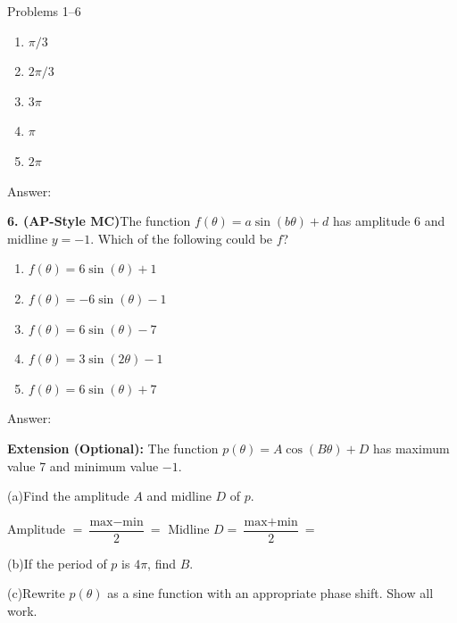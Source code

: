 \documentclass[10pt]{article}
\begin{document}
\begin{notesbox}{Problems 1--6}
\begin{enumerate}[label=(\Alph*), leftmargin=2em, itemsep=3pt]
  \item $\pi/3$
  \item $2\pi/3$
  \item $3\pi$
  \item $\pi$
  \item $2\pi$
\end{enumerate}

Answer: \underline{\hspace{1.5cm}}

\vspace{0.12in}
\textbf{6. (AP-Style MC)}\quad The function $f(\theta) = a\sin(b\theta) + d$
has amplitude 6 and midline $y = -1$. Which of the following could be $f$?

\begin{enumerate}[label=(\Alph*), leftmargin=2em, itemsep=3pt]
  \item $f(\theta) = 6\sin(\theta) + 1$
  \item $f(\theta) = -6\sin(\theta) - 1$
  \item $f(\theta) = 6\sin(\theta) - 7$
  \item $f(\theta) = 3\sin(2\theta) - 1$
  \item $f(\theta) = 6\sin(\theta) + 7$
\end{enumerate}

Answer: \underline{\hspace{1.5cm}}

\end{notesbox}

\vspace{0.08in}

\begin{extensionbox}
\textbf{Extension (Optional):} The function $p(\theta) = A\cos(B\theta) + D$
has maximum value 7 and minimum value $-1$.

\vspace{4pt}
(a)\quad Find the amplitude $A$ and midline $D$ of $p$.

\vspace{4pt}
Amplitude $= \dfrac{\text{max} - \text{min}}{2} = $ \underline{\hspace{3cm}}
\quad Midline $D = \dfrac{\text{max} + \text{min}}{2} = $ \underline{\hspace{3cm}}

\vspace{4pt}
(b)\quad If the period of $p$ is $4\pi$, find $B$.

\vspace{4pt}
(c)\quad Rewrite $p(\theta)$ as a sine function with an appropriate phase shift.
Show all work.
\end{extensionbox}
\end{document}
